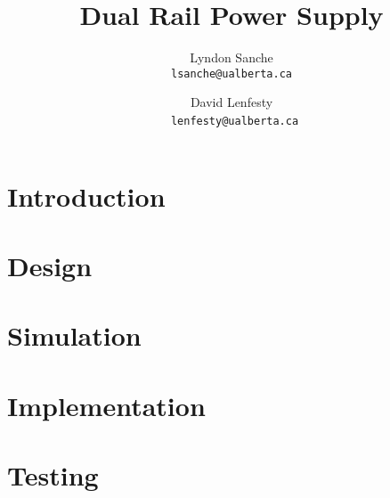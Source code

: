 \documentclass{article}
\title{Dual Rail Power Supply}
\author{
    Lyndon Sanche\\
    \texttt{lsanche@ualberta.ca}
    \and
    David Lenfesty\\\
    \texttt{lenfesty@ualberta.ca}
}
\begin{document}
\maketitle
\newpage
\tableofcontents

\section{Introduction}

\section{Design}

\section{Simulation}

\section{Implementation}

\section{Testing}
\end{document}
